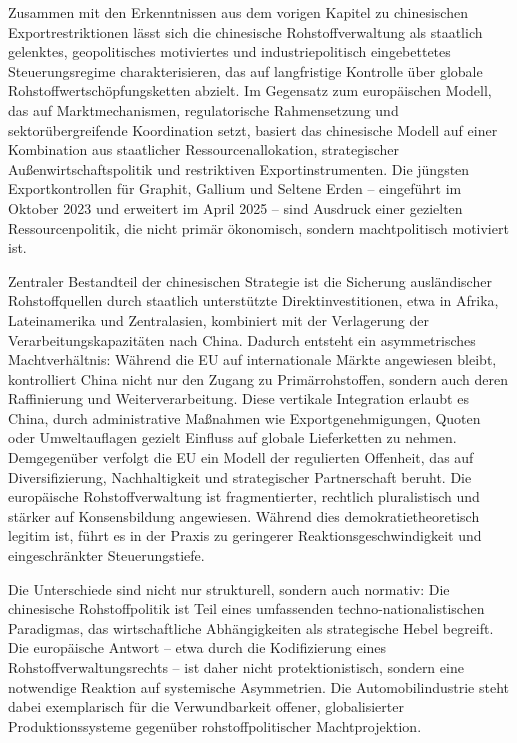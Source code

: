 \documentclass[12pt,a4paper,oneside]{book} %
\begin{document}
Zusammen mit den Erkenntnissen aus dem vorigen Kapitel zu chinesischen Exportrestriktionen lässt sich die chinesische Rohstoffverwaltung als staatlich gelenktes, geopolitisches motiviertes und industriepolitisch eingebettetes Steuerungsregime charakterisieren, das auf langfristige Kontrolle über globale Rohstoffwertschöpfungsketten abzielt. Im Gegensatz zum europäischen Modell, das auf Marktmechanismen, regulatorische Rahmensetzung und sektorübergreifende Koordination setzt, basiert das chinesische Modell auf einer Kombination aus staatlicher Ressourcenallokation, strategischer Außenwirtschaftspolitik und restriktiven Exportinstrumenten. Die jüngsten Exportkontrollen für Graphit, Gallium und Seltene Erden – eingeführt im Oktober 2023 und erweitert im April 2025 – sind Ausdruck einer gezielten Ressourcenpolitik, die nicht primär ökonomisch, sondern machtpolitisch motiviert ist. 

Zentraler Bestandteil der chinesischen Strategie ist die Sicherung ausländischer Rohstoffquellen durch staatlich unterstützte Direktinvestitionen, etwa in Afrika, Lateinamerika und Zentralasien, kombiniert mit der Verlagerung der Verarbeitungskapazitäten nach China. Dadurch entsteht ein asymmetrisches Machtverhältnis: Während die EU auf internationale Märkte angewiesen bleibt, kontrolliert China nicht nur den Zugang zu Primärrohstoffen, sondern auch deren Raffinierung und Weiterverarbeitung. Diese vertikale Integration erlaubt es China, durch administrative Maßnahmen wie Exportgenehmigungen, Quoten oder Umweltauflagen gezielt Einfluss auf globale Lieferketten zu nehmen.
\\
Demgegenüber verfolgt die EU ein Modell der regulierten Offenheit, das auf Diversifizierung, Nachhaltigkeit und strategischer Partnerschaft beruht. Die europäische Rohstoffverwaltung ist fragmentierter, rechtlich pluralistisch und stärker auf Konsensbildung angewiesen. Während dies demokratietheoretisch legitim ist, führt es in der Praxis zu geringerer Reaktionsgeschwindigkeit und eingeschränkter Steuerungstiefe.

Die Unterschiede sind nicht nur strukturell, sondern auch normativ: Die chinesische Rohstoffpolitik ist Teil eines umfassenden techno-nationalistischen Paradigmas, das wirtschaftliche Abhängigkeiten als strategische Hebel begreift. Die europäische Antwort – etwa durch die Kodifizierung eines Rohstoffverwaltungsrechts – ist daher nicht protektionistisch, sondern eine notwendige Reaktion auf systemische Asymmetrien. Die Automobilindustrie steht dabei exemplarisch für die Verwundbarkeit offener, globalisierter Produktionssysteme gegenüber rohstoffpolitischer Machtprojektion.
\end{document}
